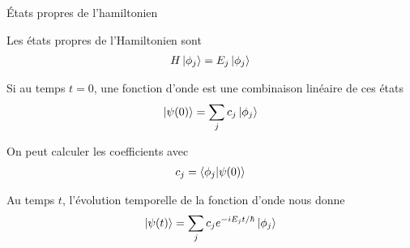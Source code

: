 \documentclass[xcolor=svgnames,t,aspectratio=169,handout]{uqtrcours}
\begin{document}
%
%
%
%
%





\begin{frame}{États propres de l'hamiltonien}

Les états propres de l'Hamiltonien sont
\begin{align}
  H \ket{\phi_j} = E_j \ket{\phi_j}
\end{align}

Si au temps $t=0$, une fonction d'onde est une combinaison linéaire
  de ces états
\begin{align}
  \ket{\psi(0)} = \sum_{j} c_j \ket{\phi_j}
\end{align}

On peut calculer les coefficients avec
\begin{align}
  c_j = \braket{\phi_j \vert \psi(0)}
\end{align}

Au temps $t$, l'évolution temporelle de la fonction d'onde nous donne
\begin{align}
  \ket{\psi(t)} = \sum_{j} c_j e^{-i E_{j} t / \hbar} \ket{\phi_j}
\end{align}

\end{frame}
\end{document}
